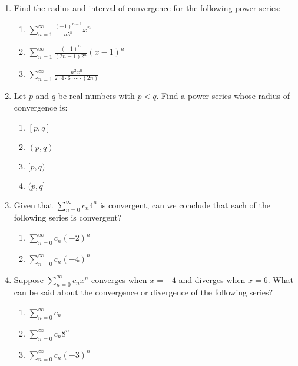 \documentclass[12pt]{article}
\newcommand{\di}{\displaystyle}
\begin{document}
 \begin{enumerate}
\item Find the radius and interval of convergence for the following power series:
\begin{enumerate}
\item $\di\sum_{n=1}^\infty\frac{(-1)^{n-1}}{n5^n}x^n$

\vspace{1.5in}

\item $\di\sum_{n=1}^\infty\frac{(-1)^n}{(2n-1)2^n}(x-1)^n$

\vspace{1.5in}

\item $\di\sum_{n=1}^\infty\frac{n^2x^n}{2\cdot 4\cdot 6\cdot\cdots\cdot (2n)}$

\vspace{1.5in}


\end{enumerate}
\item Let $p$ and $q$ be real numbers with $p<q$. Find a power series whose radius of convergence is:
\begin{multicols}{4}
\begin{enumerate}
\item $[p,q]$
\item $(p,q)$
\item $[p,q)$
\item $(p,q]$
\end{enumerate}
\end{multicols}

\newpage

\item Given that $\sum_{n=0}^\infty c_n4^n$ is convergent, can we conclude that each of the following series is convergent?
\begin{multicols}{2}
\begin{enumerate}
\item $\di\sum_{n=0}^\infty c_n(-2)^n$



\item $\di\sum_{n=0}^\infty c_n(-4)^n$
\end{enumerate}
\end{multicols}

\vspace{1.5in}

\item Suppose $\sum_{n=0}^\infty c_nx^n$ converges when $x=-4$ and diverges when $x=6$. What can be said about the convergence or divergence of the following series?
\begin{multicols}{3}
\begin{enumerate}
\item $\sum_{n=0}^\infty c_n$
\item $\sum_{n=0}^\infty c_n8^n$
\item $\sum_{n=0}^\infty c_n(-3)^n$
\end{enumerate}
\end{multicols}


\end{enumerate}
\end{document}
